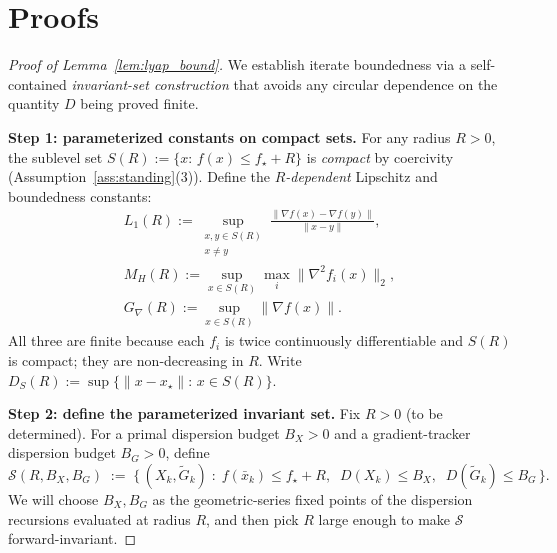 \documentclass[10pt,twocolumn,letterpaper]{article}
\theoremstyle{compact}
\theoremstyle{compactremark}
\begin{document}

\section{Proofs}\label{app:proofs}

\begin{proof}[Proof of Lemma~\ref{lem:lyap_bound}]
We establish iterate boundedness via a self-contained \emph{invariant-set
construction} that avoids any circular dependence on the quantity $D$
being proved finite.

\vspace{1pt}
\noindent\textbf{Step 1: parameterized constants on compact sets.}
For any radius $R>0$, the sublevel set
$S(R):=\{x:\,f(x)\le f_\star+R\}$
is \emph{compact} by coercivity (Assumption~\ref{ass:standing}(3)).
Define the \emph{$R$-dependent} Lipschitz and boundedness constants:
\begin{gather*}
  L_1(R):=\sup_{\substack{x,y\in S(R)\\x\ne y}}\frac{\|\nabla f(x)-\nabla f(y)\|}{\|x-y\|},\\
  M_H(R):=\sup_{x\in S(R)}\max_i\|\nabla^2 f_i(x)\|_2,\\
  G_\nabla(R):=\sup_{x\in S(R)}\|\nabla f(x)\|.
\end{gather*}
All three are finite because each $f_i$ is twice continuously differentiable
and $S(R)$ is compact; they are non-decreasing in $R$.
Write $D_S(R):=\sup\{\|x-x_\star\|:\,x\in S(R)\}$.

\vspace{1pt}
\noindent\textbf{Step 2: define the parameterized invariant set.}
Fix $R>0$ (to be determined).
For a primal dispersion budget $B_X>0$ and a gradient-tracker
dispersion budget $B_G>0$, define
\[
  \mathcal S(R,B_X,B_G) \;:=\;
  \bigl\{\,(X_k,\tilde G_k)\;:\;
  f(\bar x_k)\le f_\star+R,\;\;
  D(X_k)\le B_X,\;\;
  D(\tilde G_k)\le B_G
  \,\bigr\}.
\]
We will choose $B_X,B_G$ as the geometric-series fixed points of the
dispersion recursions evaluated at radius $R$, and then pick $R$ large
enough to make $\mathcal S$ forward-invariant.


\end{proof}
\end{document}
